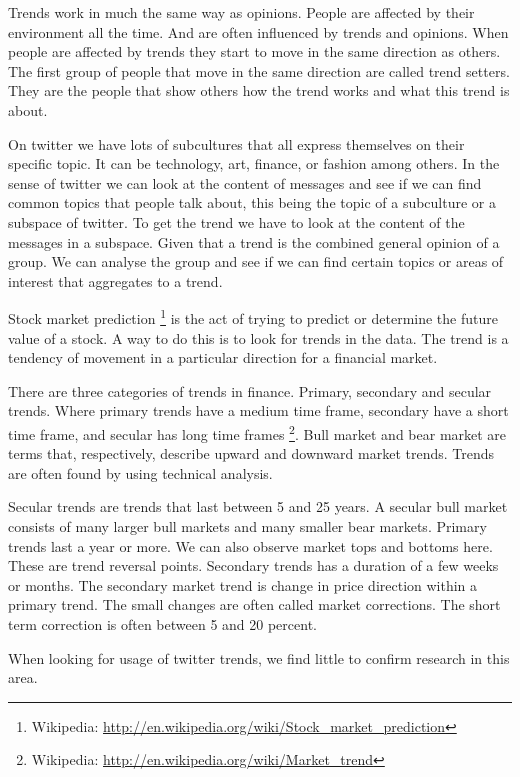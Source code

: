 Trends work in much the same way as opinions. People are affected by their
environment all the time. And are often influenced by trends and opinions. When
people are affected by trends they start to move in the same direction as
others. The first group of people that move in the same
direction are called trend setters. They are the people that show others how
the trend works and what this trend is about. 

On twitter we have lots of subcultures that all express themselves on their
specific topic. It can be technology, art, finance, or fashion among others.  
In the sense of twitter we can look at the content of
messages and see if we can find common topics that people talk
about, this being the topic of a subculture or a subspace of twitter. To get
the trend we have to look at the content of the messages in a subspace. Given
that a trend is the combined general opinion of a group. We can analyse the
group and see if we can find certain topics or areas of interest that aggregates
to a trend.  

Stock market prediction
\footnote{Wikipedia: \url{http://en.wikipedia.org/wiki/Stock_market_prediction}}
is the act of trying to predict or determine the future
value of a stock. A way to do this is to look for trends in the data. The trend
is a tendency of movement in a particular direction for a financial market.

There are three categories of trends in finance. Primary, secondary and secular
trends. Where primary trends have a medium time frame, secondary have a short
time frame, and secular has long time frames \footnote{Wikipedia:
\url{http://en.wikipedia.org/wiki/Market_trend}}. Bull market and bear market
are terms that, respectively, describe upward and downward market trends. 
Trends are often found by using technical analysis.  

Secular trends are trends that last between 5 and 25 years. A secular bull
market consists of many larger bull markets and many smaller bear markets.
Primary trends last a year or more. We can also observe market tops and
bottoms here. These are trend reversal points. Secondary trends has a
duration of a few weeks or months. The secondary market trend is change in
price direction within a primary trend. The small changes are often called
market corrections. The short term correction is often between 5 and 20 percent.

When looking for usage of twitter trends, we find little to confirm research in
this area. 
%
